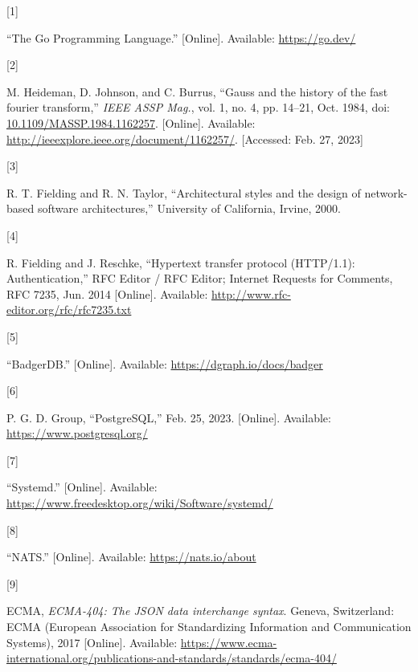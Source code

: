 \documentclass[
  letterpaper,
  a4paper,
  12pt,
  titlepage,
  oneside,
  openany]{book}
\newlength{\cslhangindent}
\newlength{\csllabelwidth}
\newlength{\cslentryspacingunit} %
\newenvironment{CSLReferences}[2] %
 {%
  \setlength{\parindent}{0pt}
  \ifodd #1
  \let\oldpar\par
  \def\par{\hangindent=\cslhangindent\oldpar}
  \fi
  \setlength{\parskip}{#2\cslentryspacingunit}
 }%
 {}
\newcommand{\CSLLeftMargin}[1]{\parbox[t]{\csllabelwidth}{#1}}
\newcommand{\CSLRightInline}[1]{\parbox[t]{\linewidth - \csllabelwidth}{#1}\break}
\begin{document}

\hypertarget{refs}{}
\begin{CSLReferences}{0}{0}
\leavevmode{}%
\CSLLeftMargin{{[}1{]} }%
\CSLRightInline{{``The {Go Programming Language}.''} {[}Online{]}.
Available: \url{https://go.dev/}}

\leavevmode{}%
\CSLLeftMargin{{[}2{]} }%
\CSLRightInline{M. Heideman, D. Johnson, and C. Burrus, {``Gauss and the
history of the fast fourier transform,''} \emph{IEEE ASSP Mag.}, vol. 1,
no. 4, pp. 14--21, Oct. 1984, doi:
\href{https://doi.org/10.1109/MASSP.1984.1162257}{10.1109/MASSP.1984.1162257}.
{[}Online{]}. Available:
\url{http://ieeexplore.ieee.org/document/1162257/}. {[}Accessed: Feb.
27, 2023{]}}

\leavevmode{}%
\CSLLeftMargin{{[}3{]} }%
\CSLRightInline{R. T. Fielding and R. N. Taylor, {``Architectural styles
and the design of network-based software architectures,''} {University
of California, Irvine}, 2000. }

\leavevmode{}%
\CSLLeftMargin{{[}4{]} }%
\CSLRightInline{R. Fielding and J. Reschke, {``Hypertext transfer
protocol ({HTTP}/1.1): {Authentication},''} {RFC Editor / RFC Editor};
Internet Requests for Comments, RFC 7235, Jun. 2014 {[}Online{]}.
Available: \url{http://www.rfc-editor.org/rfc/rfc7235.txt}}

\leavevmode{}%
\CSLLeftMargin{{[}5{]} }%
\CSLRightInline{{``{BadgerDB}.''} {[}Online{]}. Available:
\url{https://dgraph.io/docs/badger}}

\leavevmode{}%
\CSLLeftMargin{{[}6{]} }%
\CSLRightInline{P. G. D. Group, {``{PostgreSQL},''} Feb. 25, 2023.
{[}Online{]}. Available: \url{https://www.postgresql.org/}}

\leavevmode{}%
\CSLLeftMargin{{[}7{]} }%
\CSLRightInline{{``Systemd.''} {[}Online{]}. Available:
\url{https://www.freedesktop.org/wiki/Software/systemd/}}

\leavevmode{}%
\CSLLeftMargin{{[}8{]} }%
\CSLRightInline{{``{NATS}.''} {[}Online{]}. Available:
\url{https://nats.io/about}}

\leavevmode{}%
\CSLLeftMargin{{[}9{]} }%
\CSLRightInline{ECMA, \emph{{ECMA-404}: {The JSON} data interchange
syntax}. {Geneva, Switzerland}: {ECMA (European Association for
Standardizing Information and Communication Systems)}, 2017
{[}Online{]}. Available:
\url{https://www.ecma-international.org/publications-and-standards/standards/ecma-404/}}


\end{CSLReferences}
\end{document}
